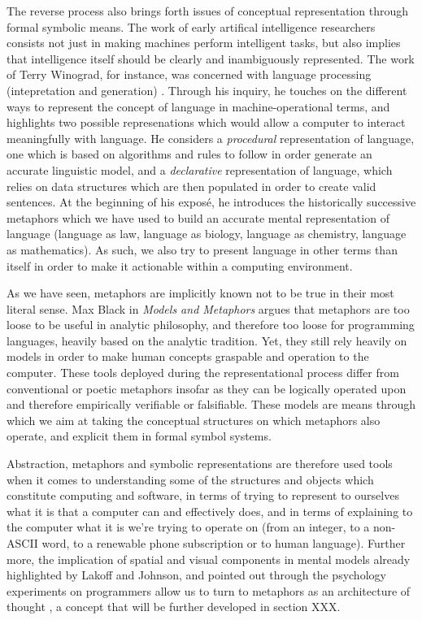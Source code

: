 The reverse process also brings forth issues of conceptual representation through formal symbolic means. The work of early artifical intelligence researchers consists not just in making machines perform intelligent tasks, but also implies that intelligence itself should be clearly and inambiguously represented. The work of Terry Winograd, for instance, was concerned with language processing (intepretation and generation) \citep{winograd_language_1982}. Through his inquiry, he touches on the different ways to represent the concept of language in machine-operational terms, and highlights two possible represenations which would allow a computer to interact meaningfully with language. He considers a \emph{procedural} representation of language, one which is based on algorithms and rules to follow in order generate an accurate linguistic model, and a \emph{declarative} representation of language, which relies on data structures which are then populated in order to create valid sentences. At the beginning of his exposé, he introduces the historically successive metaphors which we have used to build an accurate mental representation of language (language as law, language as biology, language as chemistry, language as mathematics). As such, we also try to present language in other terms than itself in order to make it actionable within a computing environment.

As we have seen, metaphors are implicitly known not to be true in their most literal sense. Max Black in \emph{Models and Metaphors} argues that metaphors are too loose to be useful in analytic philosophy, and therefore too loose for programming languages, heavily based on the analytic tradition. Yet, they still rely heavily on models in order to make human concepts graspable and operation to the computer. These tools deployed during the representational process differ from conventional or poetic metaphors insofar as they can be logically operated upon and therefore empirically verifiable or falsifiable. These models are means through which we aim at taking the conceptual structures on which metaphors also operate, and explicit them in formal symbol systems.

Abstraction, metaphors and symbolic representations are therefore used tools when it comes to understanding some of the structures and objects which constitute computing and software, in terms of trying to represent to ourselves what it is that a computer can and effectively does, and in terms of explaining to the computer what it is we're trying to operate on (from an integer, to a non-ASCII word, to a renewable phone subscription or to human language). Further more, the implication of spatial and visual components in mental models already highlighted by Lakoff and Johnson, and pointed out through the psychology experiments on programmers allow us to turn to metaphors as an architecture of thought \citep{forsythe_cathedrals_1986}, a concept that will be further developed in section XXX.

